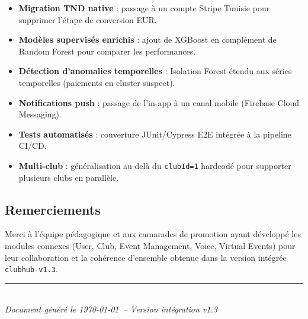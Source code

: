 \documentclass[11pt,a4paper]{article}
\begin{document}
\begin{itemize}[leftmargin=*]
  \item \textbf{Migration TND native} : passage à un compte Stripe Tunisie pour supprimer l'étape de conversion EUR.
  \item \textbf{Modèles supervisés enrichis} : ajout de XGBoost en complément de Random Forest pour comparer les performances.
  \item \textbf{Détection d'anomalies temporelles} : Isolation Forest étendu aux séries temporelles (paiements en cluster suspect).
  \item \textbf{Notifications push} : passage de l'in-app à un canal mobile (Firebase Cloud Messaging).
  \item \textbf{Tests automatisés} : couverture JUnit/Cypress E2E intégrée à la pipeline CI/CD.
  \item \textbf{Multi-club} : généralisation au-delà du \texttt{clubId=1} hardcodé pour supporter plusieurs clubs en parallèle.
\end{itemize}

\subsection{Remerciements}

Merci à l'équipe pédagogique et aux camarades de promotion ayant développé les modules connexes (User, Club, Event Management, Voice, Virtual Events) pour leur collaboration et la cohérence d'ensemble obtenue dans la version intégrée \texttt{clubhub-v1.3}.

\vfill
\begin{center}
  \rule{0.5\linewidth}{0.4pt}\\[0.4cm]
  \textit{Document généré le \today\ -- Version intégration v1.3}
\end{center}
\end{document}
